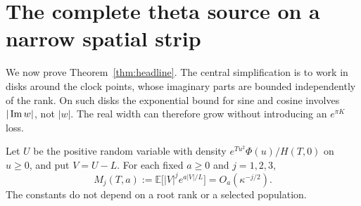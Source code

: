 \section{The complete theta source on a narrow spatial strip}
\label{sec:source}

We now prove Theorem~\ref{thm:headline}. The central simplification
is to work in disks around the clock points, whose imaginary parts
are bounded independently of the rank. On such disks the exponential
bound for sine and cosine involves $|\operatorname{Im} w|$, not $|w|$. The real
width can therefore grow without introducing an $e^{\pi K}$ loss.

\begin{lemma}
\label{lem:moments}
Let $U$ be the positive random variable with density
$e^{Tu^2}\Phi(u)/H(T,0)$ on $u\ge0$, and put $V=U-L$.
For each fixed $a\ge0$ and $j=1,2,3$,
\begin{equation}
 M_j(T,a):=\mathbb E\bigl[|V|^j e^{a|V|/L}\bigr]
 =O_a(\kappa^{-j/2}).
 \label{eq:moments}
\end{equation}
The constants do not depend on a root rank or a selected population.
\end{lemma}

